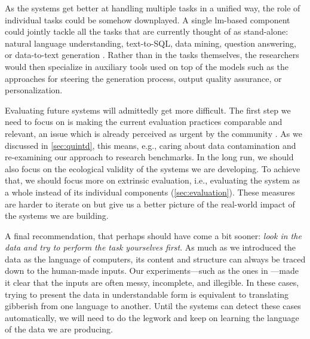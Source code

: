 As the systems get better at handling multiple tasks in a unified way, the role of individual tasks could be somehow downplayed. A single \ac{lm}-based component could jointly tackle all the tasks that are currently thought of as stand-alone: natural language understanding, text-to-SQL, data mining, question answering, or data-to-text generation \cite{schopf-etal-2023-exploring,chen2024multi}. Rather than in the tasks themselves, the researchers would then specialize in auxiliary tools used on top of the models such as the approaches for steering the generation process, output quality assurance, or personalization.


Evaluating future systems will admittedly get more difficult. The first step we need to focus on is making the current evaluation practices comparable and relevant, an issue which is already perceived as urgent by the community \cite{gehrmannRepairingCrackedFoundation2022,van_miltenburg_barriers_2023}.  As we discussed in \autoref{sec:quintd}, this means, e.g., caring about data contamination and re-examining our approach to research benchmarks. In the long run, we should also focus on the ecological validity of the systems we are developing. To achieve that, we should focus more on extrinsic evaluation, i.e., evaluating the system as a whole instead of its individual components (\autoref{sec:evaluation}). These measures are harder to iterate on but give us a better picture of the real-world impact of the systems we are building.

A final recommendation, that perhaps should have come a bit sooner: \emph{look in the data and try to perform the task yourselves first}. As much as we introduced the data as the language of computers, its content and structure can always be traced down to the human-made inputs. Our experiments---such as the ones in ---made it clear that the inputs are often messy, incomplete, and illegible. In these cases, trying to present the data in understandable form is equivalent to translating gibberish from one language to another. Until the systems can detect these cases automatically, we will need to do the legwork and keep on learning the language of the data we are producing.